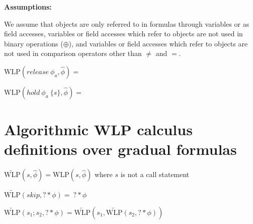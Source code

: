 \documentclass {article}
\newcommand{\lcar}{\left<}
\newcommand{\rcar}{\right>}
\newcommand{\fphi}{\widehat{\phi}}
\newcommand{\wlp}[2]{\text{WLP}(#1,#2)}
\newcommand{\twlp}[2]{\widetilde{\text{WLP}}(#1,#2)}
\begin{document}
\textbf{Assumptions:}

We assume that objects are only referred to in formulas through variables or as field accesses, variables or field accesses which refer to objects are not used in binary operations ($\oplus$), and variables or field accesses which refer to objects are not used in comparison operators other than $\neq$ and $=$.

%	
%
%
%
%
%
%

\vspace{0.5cm}

$\wlp{release \ \phi_a}{\fphi} = $

\vspace{0.5cm}

$\wlp{hold \ \phi_a \ \{s\}}{\fphi} = $

\section{Algorithmic WLP calculus definitions over gradual formulas}
\hspace{0.5cm}

$\twlp{s}{\fphi} = \wlp{s}{\fphi} $ where $s$ is not a call statement

\vspace{0.5cm}

$\twlp{skip}{? \ast \phi} = \ ? \ast \phi$

\vspace{0.5cm}

$\twlp{s_1;s_2}{? \ast \phi} = \twlp{s_1}{\twlp{s_2}{? \ast \phi}} $
\end{document}
